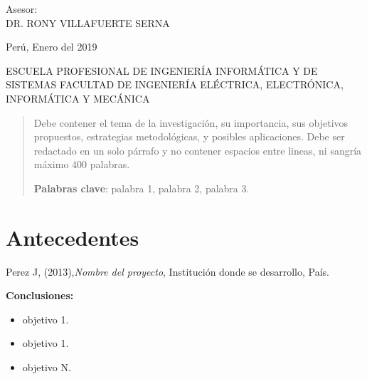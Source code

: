 \documentclass[a4paper,12pt]{report}
\begin{document}
\begin{titlepage}
\begin{flushleft}
	\hspace{4.0cm} Asesor:\\
	\hspace{4.5cm} \uppercase{Dr. Rony Villafuerte Serna}
\end{flushleft}


\vspace*{2.0in}
\begin{center}
Perú, Enero del 2019

\uppercase{\small{escuela profesional de ingeniería informática y de sistemas}}
\scriptsize{\uppercase{facultad de ingeniería eléctrica, electrónica, informática y mecánica}}
\end{center}

\end{titlepage}		

\begin{abstract}
Debe contener el tema de la investigación, su importancia, sus objetivos propuestos, estrategias metodológicas, y posibles aplicaciones. Debe ser redactado en un solo párrafo y no contener espacios entre lineas, ni sangría máximo 400 palabras.

\noindent
\textbf{Palabras clave}: palabra 1, palabra 2, palabra 3.
\end{abstract}

\newpage
\tableofcontents 

\newpage
\listoffigures

\newpage
\renewcommand{\listtablename}{Índice de Tablas} %
\listoftables

\linenumbers
\newpage
\section{Antecedentes}
Perez J, (2013),\textit{Nombre del proyecto}, Institución donde se desarrollo, País.

\noindent
\textbf{Conclusiones:}
\begin{itemize}
	\item objetivo 1.
	\item objetivo 1.
	\item objetivo N.
\end{itemize}
\end{document}
